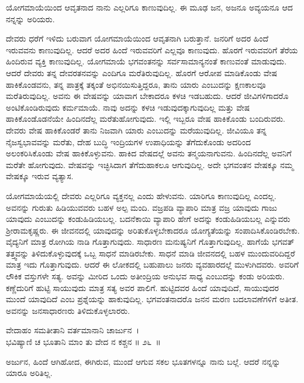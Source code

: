 \begin{artha}
ಯೋಗಮಾಯೆಯಿಂದ ಆವೃತನಾದ ನಾನು ಎಲ್ಲರಿಗೂ ಕಾಣುವುದಿಲ್ಲ. ಈ ಮೂಢ ಜನ, ಅಜನೂ ಅವ್ಯಯನೂ ಆದ ನನ್ನನ್ನು ಅರಿಯರು.
\end{artha}

ದೇವರು ಧರೆಗೆ ಇಳಿದು ಬರುವಾಗ ಯೋಗಮಾಯೆಯಿಂದ ಆವೃತನಾಗಿ ಬರುತ್ತಾನೆ. ಜನರಿಗೆ ಅದರ ಹಿಂದೆ ಇರುವವನು ಕಾಣುವುದಿಲ್ಲ. ಆದರೆ ಅದರ ಹಿಂದೆ ಇರುವವರಿಗೆ ಎಲ್ಲವೂ ಕಾಣುವುದು. ಹೊರಗೆ ಇರುವವರಿಗೆ ತೆರೆಯ ಹಿಂದಿರುವ ವ್ಯಕ್ತಿ ಕಾಣುವುದಿಲ್ಲ. ಯೋಗಮಾಯೆ ಭಗವಂತನನ್ನು ಸರ್ವಸಾಮಾನ್ಯನಂತೆ ಕಾಣುವಂತೆ ಮಾಡುವುದು. ಆದರೆ ದೇವರು ತನ್ನ ದೇವರತನವನ್ನು ಎಂದಿಗೂ ಮರೆತಿರುವುದಿಲ್ಲ. ಹೊರಗೆ ಆರೋಪ ಮಾಡಿಕೊಂಡು ವೇಷ ಹಾಕಿಕೊಂಡವನು, ತನ್ನ ಪಾತ್ರಕ್ಕೆ ತಕ್ಕಂತೆ ಅಭಿನಯಿಸುತ್ತಿದ್ದರೂ, ತಾನು ಯಾರು ಎಂಬುದನ್ನು ಕ್ಷಣಕಾಲವೂ ಮರೆತಿರುವುದಿಲ್ಲ. ಅವನು ಈ ವೇಷವನ್ನು ಯಾವಾಗ ಬೇಕಾದರೂ ಕಳಚಿ ಇಡಬಹುದು. ಆದರೆ ಜೀವಿಗಳಿಗಾದರೊ ಅಂಟಿಕೊಂಡಿರುವುದು ಕರ್ಮಮಾಯೆ. ನಾವು ಅದನ್ನು ಕಳಚಿ ಇಡುವುದಕ್ಕಾಗುವುದಿಲ್ಲ ಮತ್ತು ವೇಷ ಹಾಕಿಕೊಂಡೊಡನೆಯೇ ಹಿಂದಿನದೆಲ್ಲ ಮರೆತುಹೋಗುವುದು. ಇಲ್ಲಿ ಇಬ್ಬರೂ ವೇಷ ಹಾಕಿಕೊಂಡು ಬಂದಿರುವರು. ದೇವರು ವೇಷ ಹಾಕಿಕೊಂಡರೆ ತಾನು ನಿಜವಾಗಿ ಯಾರು ಎಂಬುದನ್ನು ಮರೆಯುವುದಿಲ್ಲ. ಜೀವಿಯೂ ತನ್ನ ನೈಜಸ್ವಭಾವವನ್ನು ಮರೆತು, ದೇಹ ಬುದ್ಧಿ ಇಂದ್ರಿಯಗಳ ಉಪಾಧಿಯನ್ನು ತೆಗೆದುಕೊಂಡು ಅದರಿಂದ ಅಲಂಕರಿಸಿಕೊಂಡು ವೇಷ ಹಾಕಿಕೊಳ್ಳುವನು. ಹಾಕಿದ ವೇಷದಲ್ಲೆ ಅವನು ತನ್ಮಯನಾಗು\-ವನು. ಹಿಂದಿನದೆಲ್ಲ ಅವನಿಗೆ ಮರೆತೇ ಹೋಗುವುದು. ವೇಷವನ್ನು ಇಚ್ಛಿಸಿದಾಗ ತೆಗೆದುಹಾಕಲೂ ಆಗುವುದಿಲ್ಲ. ಅದೇ ಭಗವಂತನ ವೇಷಕ್ಕೂ ನಮ್ಮ ವೇಷಕ್ಕೂ ಇರುವ ವ್ಯತ್ಯಾಸ.

ಯೋಗಮಾಯೆಯಲ್ಲಿ ದೇವರು ಎಲ್ಲರಿಗೂ ವ್ಯಕ್ತನಲ್ಲ ಎಂದು ಹೇಳುವನು. ಯಾರಿಗೂ ಕಾಣುವುದಿಲ್ಲ ಎಂದಲ್ಲ. ಅವನನ್ನು ಗುರುತು ಹಿಡಿಯುವವರು ಬಹಳ ಅಲ್ಪ ಮಂದಿ. ವಜ್ರಪಡಿ ವ್ಯಾಪಾರಿ ಮಾತ್ರ ವಜ್ರ ಯಾವುದು ಗಾಜು ಯಾವುದು ಎಂಬುದನ್ನು ಕಂಡುಹಿಡಿಯಬಲ್ಲ. ಬದನೆಕಾಯಿ ವ್ಯಾಪಾರಿ ಹೇಗೆ ಅದನ್ನು ಕಂಡುಹಿಡಿಯಬಲ್ಲ ಎನ್ನುವರು ಶ‍್ರೀರಾಮಕೃಷ್ಣರು. ಈ ಜೀವನದಲ್ಲಿ ಯಾವುದನ್ನು ಅರಿತುಕೊಳ್ಳಬೇಕಾದರೂ ಯೋಗ್ಯತೆಯನ್ನು ಸಂಪಾದಿಸಿಕೊಂಡಿರಬೇಕು. ವೈದ್ಯನಿಗೆ ಮಾತ್ರ ರೋಗಿಯ ನಾಡಿ ಗೊತ್ತಾಗುವುದು. ಸಾಧಾರಣ ಮನುಷ್ಯನಿಗೆ ಗೊತ್ತಾಗುವುದಿಲ್ಲ. ಹಾಗೆಯೆ ಭಗವತ್ ತತ್ತ್ವವನ್ನು ತಿಳಿದುಕೊಳ್ಳುವುದಕ್ಕೆ ಒಬ್ಬ ಸಾಧನೆ ಮಾಡಿರಬೇಕು. ಸಾಧನೆ ಮಾಡಿ ಜೀವನದಲ್ಲಿ ಬಹಳ ಮುಂದುವರಿದಿದ್ದರೆ ಮಾತ್ರ ಇದು ಗೊತ್ತಾಗುವುದು. ಆದರೆ ಈ ಲೋಕದಲ್ಲಿ ಬಹುಪಾಲು ಜನರು ವ್ಯವಹಾರದಲ್ಲೆ ಮುಳುಗಿದವರು. ಅವರಿಗೆ ಲೌಕಿಕ ವಸ್ತುಗಳೇ ಸತ್ಯ. ಅವನ್ನು ಮೀರಿದ ಒಂದು ಅತೀಂದ್ರಿಯ ಅನುಭವ ಸಾಧ್ಯ ಎಂಬುದನ್ನು ಕಂಡು ಅರಿಯರು. ಕಣ್ಣೆದುರಿಗೆ ಹುಟ್ಟಿ ಸಾಯುವುದು ಮಾತ್ರ ಸತ್ಯ ಅವರ ಪಾಲಿಗೆ. ಹುಟ್ಟಿದವರ ಹಿಂದೆ ಯಾವುದಿದೆ, ಸಾಯುವುದರ ಮುಂದೆ ಯಾವುದಿದೆ ಎಂಬ ಪ್ರಶ್ನೆಯನ್ನು ಹಾಕುವುದಿಲ್ಲ. ಭಗವಂತನಾದರೊ ಜನನ ಮರಣ ಬದಲಾವಣೆಗಳಿಗೆ ಅತೀತ. ಅವನನ್ನು ಜನಸಾಧಾರಣರು ತಿಳಿದುಕೊಳ್ಳಲಾರರು.

\begin{shloka}
ವೇದಾಹಂ ಸಮತೀತಾನಿ ವರ್ತಮಾನಾನಿ ಚಾರ್ಜುನ~।\\ಭವಿಷ್ಯಾಣಿ ಚ ಭೂತಾನಿ ಮಾಂ ತು ವೇದ ನ ಕಶ್ಚನ \hfill॥ ೨೬~॥
\end{shloka}

\begin{artha}
ಅರ್ಜುನ, ಹಿಂದೆ ಆಗಿಹೋದ, ಈಗಿರುವ, ಮುಂದೆ ಆಗುವ ಸಕಲ ಭೂತಗಳನ್ನೂ ನಾನು ಬಲ್ಲೆ. ಆದರೆ ನನ್ನನ್ನು ಯಾರೂ ಅರಿತಿಲ್ಲ.
\end{artha}

